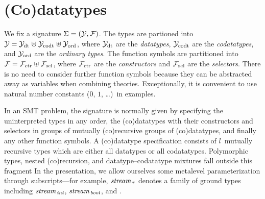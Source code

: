 
\section{%
(Co)datatypes}
\label{sec:the-theory-of-co-datatypes}


We fix a signature $\mathrm{\Sigma} = (\mathcal{Y}, \mathcal{F})$. The types are partioned into
$\mathcal{Y} = \mathcal{Y}_{\mathrm{dt}} \mathrel{\uplus} \mathcal{Y}_{\mathrm{codt}} \mathrel{\uplus} \mathcal{Y}_{\mathrm{ord}}$, where $\mathcal{Y}_{\mathrm{dt}}$ are the
\emph{datatypes}, $\mathcal{Y}_{\mathrm{codt}}$ are the \emph{codatatypes}, and $\mathcal{Y}_{\mathrm{ord}}$ are the %
\emph{ordinary types}. The function symbols are partitioned into $\mathcal{F} = \mathcal{F}_{\mathrm{ctr}}
\mathrel{\uplus} \mathcal{F}_{\mathrm{sel}}$, where $\mathcal{F}_{\mathrm{ctr}}$ are the \emph{constructors} and $\mathcal{F}_{\mathrm{sel}}$ are the
\emph{selectors}. There is no need to consider further function symbols
because they can be abstracted away as variables when combining theories.
Exceptionally, it is convenient to use natural number
constants ($0$, $1$, \ldots)\ in examples.

In an SMT problem, the signature is normally given by specifying the
uninterpreted types in any order, the (co)datatypes with their constructors
and selectors in groups of mutually (co)recursive groups of (co)datatypes, and
finally any other function symbols.
%
A (co)datatype specification consists of $l$~mutually recursive types which are
either all datatypes or all codatatypes. Polymorphic types, nested
(co)recursion, and datatype--codatatype mixtures fall outside this fragment%
In the presentation, we allow ourselves some metalevel parameterization
through subscripts---for example, $\textit{stream}_{\,\tau}$ denotes a
family of ground types including
$\textit{stream}_{\,\textit{int}}$, $\textit{stream}_{\,\textit{bool}}$,
and .

